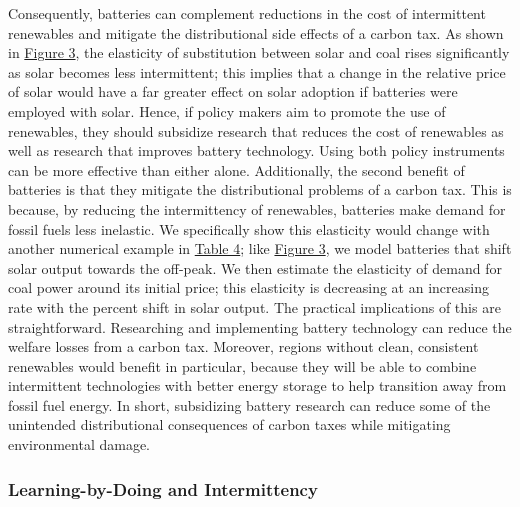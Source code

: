 \documentclass[11pt,a4paper]{extarticle}
\begin{document}
Consequently, batteries can complement reductions in the cost of intermittent renewables and mitigate the distributional side effects of a carbon tax. As shown in \hyperref[fig:battery]{Figure 3}, the elasticity of substitution between solar and coal rises significantly as solar becomes less intermittent; this implies that a change in the relative price of solar would have a far greater effect on solar adoption if batteries were employed with solar. Hence, if policy makers aim to promote the use of renewables, they should subsidize research that reduces the cost of renewables as well as research that improves battery technology. Using both policy instruments can be more effective than either alone. Additionally, the second benefit of batteries is that they mitigate the distributional problems of a carbon tax. This is because, by reducing the intermittency of renewables, batteries make demand for fossil fuels less inelastic. We specifically show this elasticity would change with another numerical example in \hyperref[table:4]{Table 4}; like  \hyperref[fig:battery]{Figure 3}, we model batteries that shift solar output towards the off-peak. We then estimate the elasticity of demand for coal power around its initial price; this elasticity is decreasing at an increasing rate with the percent shift in solar output. The practical implications of this are straightforward. Researching and implementing battery technology can reduce the welfare losses from a carbon tax. Moreover, regions without clean, consistent renewables would benefit in particular, because they will be able to combine intermittent technologies with better energy storage to help transition away from fossil fuel energy. In short, subsidizing battery research can reduce some of the unintended distributional consequences of carbon taxes while mitigating environmental damage. 

\subsubsection{Learning-by-Doing and Intermittency}
\end{document}
